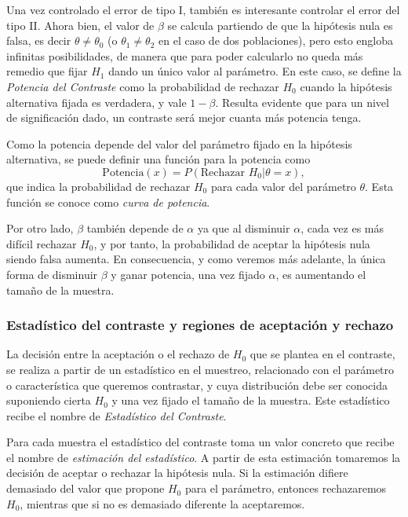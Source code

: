 Una vez controlado el error de tipo I, también es interesante controlar el
error del tipo II. Ahora bien, el valor de $\beta$ se calcula partiendo de que
la hipótesis nula es falsa, es decir $\theta\neq \theta_0$ (o $\theta_1\neq
\theta_2$ en el caso de dos poblaciones), pero esto engloba infinitas
posibilidades, de manera que para poder calcularlo no queda más remedio que
fijar $H_1$ dando un único valor al parámetro. En este caso, se define la
\emph{Potencia del Contraste} como la probabilidad de rechazar $H_0$ cuando la
hipótesis alternativa fijada es verdadera, y vale $1-\beta$. Resulta evidente
que para un nivel de significación dado, un contraste será mejor cuanta más potencia tenga.

Como la potencia depende del valor del parámetro fijado en la hipótesis
alternativa, se puede definir una función para la potencia como
\[ \textrm{Potencia} (x)=P(\textrm{Rechazar }H_0|\theta=x),\]
que indica la probabilidad de rechazar $H_0$ para cada valor del parámetro
$\theta$. Esta función se conoce como \emph{curva de potencia}.

Por otro lado, $\beta$ también depende de $\alpha$ ya que al disminuir
$\alpha$, cada vez es más difícil rechazar $H_0$, y por tanto, la probabilidad
de aceptar la hipótesis nula siendo falsa aumenta. En consecuencia, y como
veremos más adelante, la única forma de disminuir $\beta$ y ganar potencia, una
vez fijado $\alpha$, es aumentando el tamaño de la muestra.


\subsubsection{Estadístico del contraste y regiones de aceptación y rechazo}

La decisión entre la aceptación o el rechazo de $H_0$ que se plantea en el
contraste, se realiza a partir de un estadístico en el muestreo, relacionado con
el parámetro o característica que queremos contrastar, y cuya distribución debe
ser conocida suponiendo cierta $H_0$ y una vez fijado el tamaño de la muestra.
Este estadístico recibe el nombre de \emph{Estadístico del Contraste}.

Para cada muestra el estadístico del contraste toma un valor concreto que recibe
el nombre de \emph{estimación del estadístico}. A partir de esta
estimación tomaremos la decisión de aceptar o rechazar la hipótesis nula.
Si la estimación difiere demasiado del valor que propone $H_0$ para el
parámetro, entonces rechazaremos $H_0$, mientras que si no es demasiado
diferente la aceptaremos.

